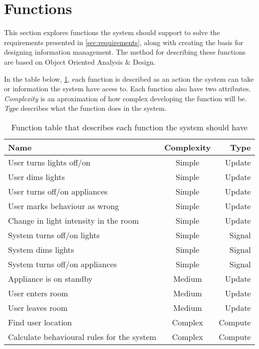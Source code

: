 \section{Functions}
This section explores functions the system should support to solve the requirements presented in \cref{sec:requirements}, along with creating the basis for designing information management. The method for describing these functions are based on Object Oriented Analysis \& Design\cite{OOAD}.


\label{subsec:Functions}
In the table below, \cref{table:functionlist}, each function is described as an action the system can take or information the system have acess to. Each function also have two attributes. \textit{Complexity} is an aproximation of how complex developing the function will be. \textit{Type} describes what the function does in the system\cite{OOAD}.
\begin{table}[hbtp]
\centering
\begin{tabular}{lcr}
\toprule
\textbf{Name}																& \textbf{Complexity}	& \textbf{Type} \\
\midrule
User turns lights off/on				& Simple	& Update  \\
User dims lights					& Simple	& Update  \\
User turns off/on appliances			& Simple	& Update  \\
User marks behaviour as wrong			& Simple	& Update  \\
Change in light intensity in the room		& Simple	& Update  \\
System turns off/on lights			& Simple	& Signal  \\
System dims lights				& Simple	& Signal  \\
System turns off/on appliances			& Simple	& Signal  \\
Appliance is on standby				& Medium	& Update  \\
User enters room				& Medium	& Update  \\
User leaves room				& Medium	& Update  \\
Find user location			& Complex	& Compute \\
Calculate behavioural rules for the system	& Complex	& Compute \\
\bottomrule
\end{tabular}
\caption{Function table that describes each function the system should have}
\label{table:functionlist}
\end{table}

